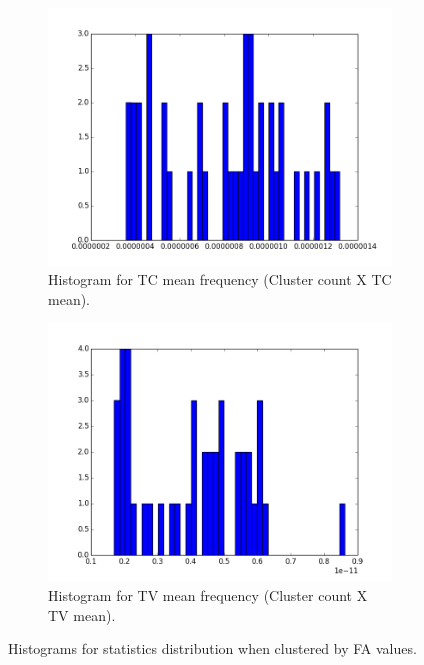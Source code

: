 \documentclass[a4paper,11pt]{report}
\begin{document}
\begin{figure}[!ht]
\begin{subfigure}[t]{.49\textwidth}
        \label{subfig:fa_hist_rd}
      \end{subfigure}\hfill\\
      \begin{subfigure}[t]{.49\textwidth}
        \includegraphics[width=1\linewidth]{img/histograms/fa_clustered_fa_mask_tc_means_hist.png}
        \caption{Histogram for TC mean frequency (Cluster count X TC mean).}
        \label{subfig:fa_hist_tc}
      \end{subfigure}\hfill%
      \begin{subfigure}[t]{.49\textwidth}
        \includegraphics[width=1\linewidth]{img/histograms/fa_clustered_fa_mask_tv_means_hist.png}
        \caption{Histogram for TV mean frequency (Cluster count X TV mean).}
        \label{subfig:fa_hist_tv}
      \end{subfigure}\hfill

      \caption{Histograms for statistics distribution when clustered by FA values.}
      \label{fig:fa-histograms}
    \end{figure}
\end{document}
